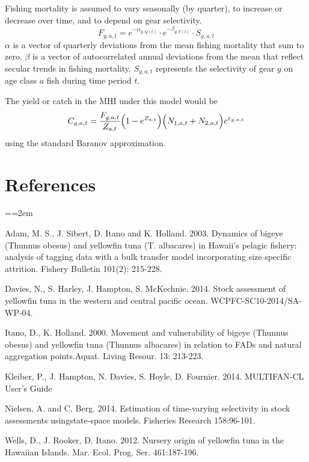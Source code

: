 \documentclass[12pt,letterpaper]{article}
\newcommand\doublespacing{\baselineskip=1.6\normalbaselineskip}
\newcommand\singlespacing{\baselineskip=1.0\normalbaselineskip}
\newcommand\MFCL{MULTIFAN-CL}
\newcommand\help[1]{\color{Magenta}{\it #1 }\normalcolor}
\begin{document}
Fishing mortality is assumed to vary
seasonally (by quarter), to increase or decrease over time, and to
depend on gear selectivity.
\begin{equation}
F_{g,a,t} = e^{-\alpha_{g,Q(t)}}\cdot e^{-\beta_{g,Y(t)}}\cdot S_{g,a,t}
\end{equation}
$\alpha$ is a vector of quarterly deviations from the mean
fishing mortality that sum to zero.
$\beta$ is a vector of autocorrelated annual deviations from the mean
that reflect secular trends in fishing mortality.
$S_{g,a,t}$ represents the selectivity of gear $g$ on age class $a$
fish during time period $t$.
\help{At this point, is is not clear whether
seculare trends in gear efficiency would be best parameterized by
$\beta$ or by $S$.}



The yield or catch in the MHI under this model would be
\begin{equation}
C_{g,a,t} =
\frac{F_{g,a,t}}{Z_{a,t}}\Big(1-e^{Z_{a,t}}\Big)\Big(N_{1,a,t}+N_{2,a,t}\Big)e^{\varepsilon_{g,a,t}}
\end{equation}
using the standard Baranov approximation.

\singlespacing
\section*{References}
{\parindent=0cm \small
\everypar={\hangindent=2em }\par
\doublespacing
Adam, M. S., J. Sibert, D. Itano and K. Holland. 2003. Dynamics of
bigeye (Thunnus obesus) and yellowfin tuna (T. albacares) in Hawaii's
pelagic fishery: analysis of tagging data with a bulk transfer model
incorporating size specific attrition. Fishery Bulletin 101(2):
215-228.

Davies, N., S. Harley, J. Hampton, S. McKechnie. 2014. Stock
assessment of yellowfin tuna in the western and central pacific ocean.
WCPFC-SC10-2014/SA-WP-04.

Itano, D., K. Holland. 2000.  Movement and vulnerability of bigeye
(Thunnus obesus) and yellowfin tuna (Thunnus albacares) in relation to
FADs and natural aggregation points.Aquat. Living Resour. 13: 213-223.

Kleiber, P., J. Hampton, N. Davies, S. Hoyle, D. Fournier. 2014.
MULTIFAN-CL User’s Guide

Nielsen, A. and C. Berg. 2014. Estimation of time-varying selectivity
in stock assessments usingstate-space models. Fisheries Research
158:96-101.

Wells, D., J. Rooker, D. Itano. 2012.  Nursery origin of yellowfin
tuna in the Hawaiian Islands. Mar. Ecol. Prog. Ser. 461:187-196. 
\par}
\end{document}
